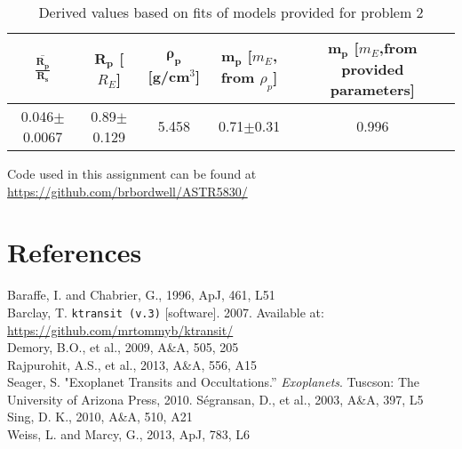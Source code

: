 \documentclass[10pt, preprint]{aastex}
\begin{document}
\begin{table} 
\begin{tabular}{ccccc}
$\mathbf{\overline{\frac{R_p}{R_s}}}$ & $\mathbf{R_p}$ [$R_E$]& $\mathbf{\rho_p}$ [g/cm$^3$]& $\mathbf{m_p}$ [$m_E$, from $\rho_p$] & $\mathbf{m_p}$ [$m_E$,from provided parameters] \\ \hline
0.046$\pm$0.0067 & 0.89$\pm$0.129 & 5.458 & 0.71$\pm$0.31 & 0.996\\
\end{tabular}
\caption{Derived values based on fits of models provided for problem 2 \label{derive2}}
\end{table}





\FloatBarrier

\flush
Code used in this assignment can be found at \url{https://github.com/brbordwell/ASTR5830/}

\section*{References}
\noindent Baraffe, I. and Chabrier, G., 1996, ApJ, 461, L51 \\%
Barclay, T. \verb|ktransit (v.3)| [software]. 2007.
Available at: \url{https://github.com/mrtommyb/ktransit/} \\
Demory, B.O., et al., 2009, A\&A, 505, 205 \\ %
Rajpurohit, A.S., et al., 2013, A\&A, 556, A15 \\%
Seager, S. "Exoplanet Transits and Occultations.'' \emph{Exoplanets}. Tuscson: The University of Arizona Press, 2010.
S\'egransan, D., et al., 2003, A\&A, 397, L5 \\ %
Sing, D. K., 2010, A\&A, 510, A21 \\ %
Weiss, L. and Marcy, G., 2013, ApJ, 783, L6
\end{document}
